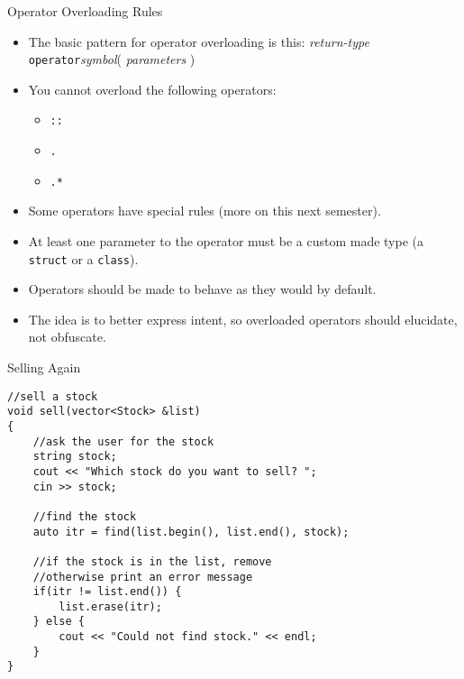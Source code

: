 \documentclass[]{beamer}
\begin{document}
\begin{frame}{Operator Overloading Rules}
    \begin{itemize}[<+->]
        \item The basic pattern for operator overloading is this:
            \newline \textit{return-type} \texttt{operator}\textit{symbol}( \textit{parameters} )
        \item You cannot overload the following operators:
            \begin{itemize}
                \item \texttt{::}
                \item \texttt{.}
                \item \texttt{.*}
            \end{itemize}
        \item Some operators have special rules (more on this next semester).
        \item At least one parameter to the operator must be a custom
            made type (a \texttt{struct} or a \texttt{class}).
        \item Operators should be made to behave as they would by default.
        \item The idea is to better express intent, so overloaded operators
            should elucidate, not obfuscate.
    \end{itemize}
\end{frame}

\begin{frame}[fragile]{Selling Again}
\begin{adjustbox}{max width=0.9\textwidth}
\begin{BVerbatim}
//sell a stock
void sell(vector<Stock> &list)
{
    //ask the user for the stock
    string stock;
    cout << "Which stock do you want to sell? ";
    cin >> stock;
    
    //find the stock
    auto itr = find(list.begin(), list.end(), stock);

    //if the stock is in the list, remove
    //otherwise print an error message
    if(itr != list.end()) {
        list.erase(itr);
    } else {
        cout << "Could not find stock." << endl;
    }
}
\end{BVerbatim}
\end{adjustbox}
\end{frame}
\end{document}
